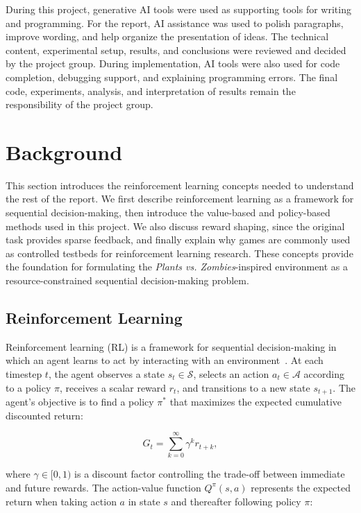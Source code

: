 \documentclass[conference,onecolumn]{IEEEtran}
\begin{document}
During this project, generative AI tools were used as supporting tools for writing and programming. For the report, AI assistance was used to polish paragraphs, improve wording, and help organize the presentation of ideas. The technical content, experimental setup, results, and conclusions were reviewed and decided by the project group. During implementation, AI tools were also used for code completion, debugging support, and explaining programming errors. The final code, experiments, analysis, and interpretation of results remain the responsibility of the project group.

\section{Background}
\label{sec:background}

This section introduces the reinforcement learning concepts needed to understand the rest of the report. We first describe reinforcement learning as a framework for sequential decision-making, then introduce the value-based and policy-based methods used in this project. We also discuss reward shaping, since the original task provides sparse feedback, and finally explain why games are commonly used as controlled testbeds for reinforcement learning research. These concepts provide the foundation for formulating the \textit{Plants vs. Zombies}-inspired environment as a resource-constrained sequential decision-making problem.

\subsection{Reinforcement Learning}

Reinforcement learning (RL) is a framework for sequential decision-making in which an agent learns to act by interacting with an environment~\cite{sutton1998reinforcement}. At each timestep $t$, the agent observes a state $s_t \in \mathcal{S}$, selects an action $a_t \in \mathcal{A}$ according to a policy $\pi$, receives a scalar reward $r_t$, and transitions to a new state $s_{t+1}$. The agent's objective is to find a policy $\pi^*$ that maximizes the expected cumulative discounted return:

\begin{equation}
G_t = \sum_{k=0}^{\infty} \gamma^k r_{t+k},
\end{equation}

where $\gamma \in [0, 1)$ is a discount factor controlling the trade-off between immediate and future rewards. The action-value function $Q^\pi(s, a)$ represents the expected return when taking action $a$ in state $s$ and thereafter following policy $\pi$:
\end{document}
